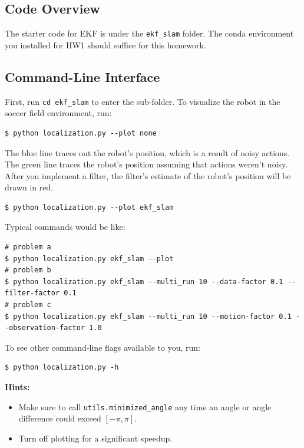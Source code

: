 \documentclass[tp]{lcc}
\begin{document}
\subsection*{Code Overview}
The starter code for EKF is under the \texttt{ekf\_slam} folder. The conda environment you installed for HW1 should suffice for this homework.

\subsection*{Command-Line Interface}
First, run \texttt{cd ekf\_slam} to enter the sub-folder. To visualize the robot in the soccer field environment, run:

\begin{verbatim}
$ python localization.py --plot none
\end{verbatim}

The blue line traces out the robot's position, which is a result of noisy actions. The green line traces the robot's position assuming that actions weren't noisy. After you implement a filter, the filter's estimate of the robot's position will be drawn in red.

\begin{verbatim}
$ python localization.py --plot ekf_slam
\end{verbatim}

Typical commands would be like:

\begin{verbatim}
# problem a
$ python localization.py ekf_slam --plot
# problem b
$ python localization.py ekf_slam --multi_run 10 --data-factor 0.1 --filter-factor 0.1
# problem c
$ python localization.py ekf_slam --multi_run 10 --motion-factor 0.1 --observation-factor 1.0
\end{verbatim}

To see other command-line flags available to you, run:

\begin{verbatim}
$ python localization.py -h
\end{verbatim}

\textbf{Hints:}
\begin{itemize}
    \item Make sure to call \texttt{utils.minimized\_angle} any time an angle or angle difference could exceed $[-\pi,\pi]$.
    \item Turn off plotting for a significant speedup.
\end{itemize}
\end{document}
